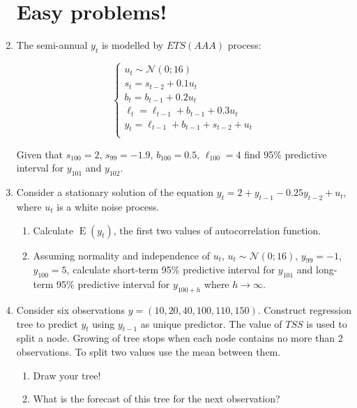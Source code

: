 \documentclass[12pt]{article}
\DeclareMathOperator{\E}{E}
\def \cN{\mathcal{N}}
\begin{document}
\begin{enumerate}


\section*{Easy problems!}

\item The semi-annual $y_t$ is modelled by $ETS(AAA)$ process:
    
\[
\begin{cases}
	u_t \sim \cN(0; 16) \\
	s_t = s_{t-2} + 0.1 u_t \\
	b_t = b_{t-1} + 0.2 u_t \\
	\ell_t = \ell_{t-1} + b_{t-1} + 0.3 u_t \\
	y_t = \ell_{t-1} + b_{t-1} + s_{t-2} + u_t \\
\end{cases}    
\]

Given that $s_{100} = 2$, $s_{99} = -1.9$, $b_{100} = 0.5$, $\ell_{100} = 4$ find 95\% predictive interval for $y_{101}$ and $y_{102}$. 


\item Consider a stationary solution of the equation $y_t = 2 + y_{t-1} - 0.25 y_{t-2} + u_t $, 
	where $u_t$ is a white noise process. 

\begin{enumerate}
	\item Calculate $\E(y_t)$, the first two values of autocorrelation function.
	\item Assuming normality and independence of $u_t$, $u_t \sim \cN(0; 16)$, $y_{99}=-1$, $y_{100}=5$, 
	calculate short-term 95\% predictive interval for $y_{101}$ and long-term 95\% predictive interval for $y_{100+h}$ 
	where $h \to \infty$.
\end{enumerate}


\item Consider six observations $y = (10, 20, 40, 100, 110, 150)$. 
Construct regression tree to predict $y_t$ using $y_{t-1}$ as unique predictor.
The value of $TSS$ is used to split a node. Growing of tree stops when each node contains no more than 2 observations. 
To split two values use the mean between them. 

\begin{enumerate}
	\item Draw your tree!
	\item What is the forecast of this tree for the next observation?
\end{enumerate}




\end{enumerate}
\end{document}
